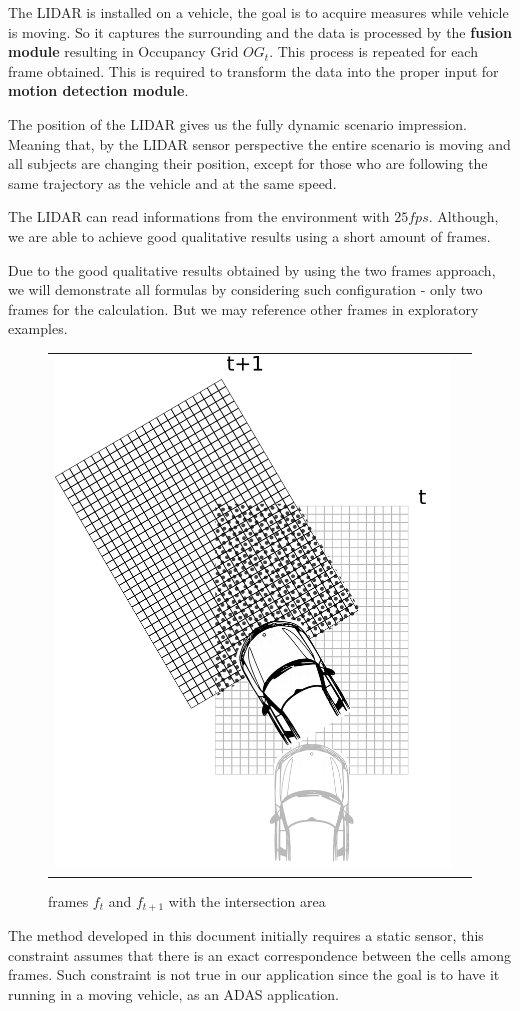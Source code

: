 The LIDAR is installed on a vehicle, the goal is to acquire measures while vehicle is moving. So it captures the surrounding and the data is processed by the \textbf{fusion module} resulting in Occupancy Grid $OG_t$. This process is repeated for each frame obtained. This is required to transform the data into the proper input for \textbf{motion detection module}.

The position of the LIDAR gives us the fully dynamic scenario impression. Meaning that, by the LIDAR sensor perspective the entire scenario is moving and all subjects are changing their position, except for those who are following the same trajectory as the vehicle and at the same speed. 

The LIDAR can read informations from the environment with $25fps$. Although, we are able to achieve good qualitative results using a short amount of frames. 

Due to the good qualitative results obtained by using the two frames approach, we will demonstrate all formulas by considering such configuration - only two frames for the calculation. But we may reference other frames in exploratory examples.


\begin{figure}[h]
   \centering
     \begin{tabular}{lr}
       \includegraphics[width=0.35\columnwidth]{img/fig:motion:algorithm:nonstatic:01}
     \end{tabular}
   \caption{frames $f_t$ and $f_{t+1}$ with the intersection area}
   \label{fig:motion:algorithm:nonstatic:01}
 \end{figure}

The method developed in this document initially requires a static sensor, this constraint assumes that there is an exact correspondence between the cells among frames. Such constraint is not true in our application since the goal is to have it running in a moving vehicle, as an ADAS application. 

